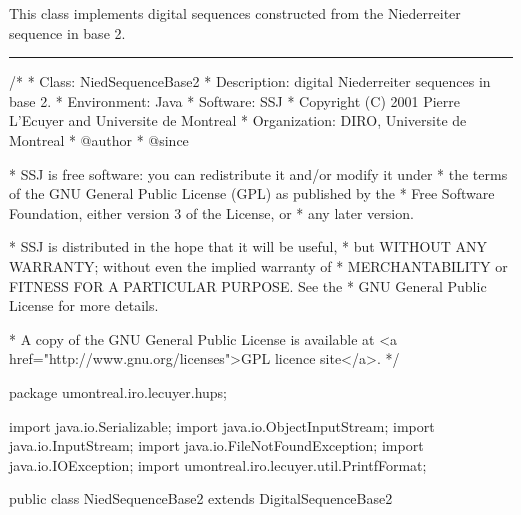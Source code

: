 
This class implements digital sequences constructed from the
Niederreiter sequence in base 2.


\bigskip\hrule
\begin{code}
\begin{hide}
/*
 * Class:        NiedSequenceBase2
 * Description:  digital Niederreiter sequences in base 2.
 * Environment:  Java
 * Software:     SSJ 
 * Copyright (C) 2001  Pierre L'Ecuyer and Universite de Montreal
 * Organization: DIRO, Universite de Montreal
 * @author       
 * @since

 * SSJ is free software: you can redistribute it and/or modify it under
 * the terms of the GNU General Public License (GPL) as published by the
 * Free Software Foundation, either version 3 of the License, or
 * any later version.

 * SSJ is distributed in the hope that it will be useful,
 * but WITHOUT ANY WARRANTY; without even the implied warranty of
 * MERCHANTABILITY or FITNESS FOR A PARTICULAR PURPOSE.  See the
 * GNU General Public License for more details.

 * A copy of the GNU General Public License is available at
   <a href="http://www.gnu.org/licenses">GPL licence site</a>.
 */
\end{hide}
package umontreal.iro.lecuyer.hups;\begin{hide}

import java.io.Serializable;
import java.io.ObjectInputStream;
import java.io.InputStream;
import java.io.FileNotFoundException;
import java.io.IOException;
import umontreal.iro.lecuyer.util.PrintfFormat;
\end{hide}

public class NiedSequenceBase2 extends DigitalSequenceBase2\begin{hide} { 

   private static final int MAXDIM = 318;  // Maximum dimension.
   private static final int NUMCOLS = 30;  // Maximum number of columns.
\end{hide} 
\end{code}
